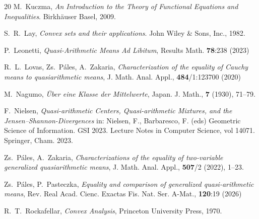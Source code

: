 \documentclass[12pt]{amsart}
\theoremstyle{remark}
\theoremstyle{definition}
\begin{document}
\begin{thebibliography}{20}
M.~Kuczma, 
{\em An Introduction to the Theory of 
Functional Equations and Inequalities}. 
Birkhäuser Basel, 2009. 

S.~R.~Lay, 
{\em Convex sets and their applications}. 
John Wiley \& Sons, Inc., 1982. 

P.~Leonetti, 
{\em Quasi-Arithmetic Means Ad Libitum}, 
Results Math. {\bf 78}:238 (2023) 

R.~L.~Lovas, Zs.~Páles, A.~Zakaria, 
{\em Characterization of the equality of 
Cauchy means to quasiarithmetic means}, 
J. Math. Anal. Appl., {\bf 484}/1:123700 (2020)

M.~Nagumo, 
{\em Über eine Klasse der Mittelwerte}, 
Japan. J. Math., {\bf 7} (1930), 71--79. 

F.~Nielsen, 
{\em Quasi-arithmetic Centers, 
Quasi-arithmetic Mixtures, and the Jensen--Shannon-Divergences} 
in: Nielsen, F., Barbaresco, F. (eds) 
Geometric Science of Information. GSI 2023. 
Lecture Notes in Computer Science, 
vol 14071. Springer, Cham. 2023.

Zs.~Páles, A.~Zakaria, 
{\em Characterizations of the equality of 
two-variable generalized quasiarithmetic means}, 
J. Math. Anal. Appl., {\bf 507}/2 (2022), 1--23. 

Zs.~Páles, P.~Pasteczka, 
{\em Equality and comparison of 
generalized quasi-arithmetic means}, 
Rev. Real Acad. Cienc. Exactas Fis. Nat. Ser. A-Mat., 
{\bf 120}:19 (2026) 

R.~T.~Rockafellar, 
{\em Convex Analysis}, 
Princeton University Press, 1970. 

\end{thebibliography}
\end{document}
